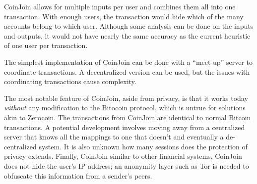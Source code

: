 CoinJoin allows for multiple inputs per user and combines them all into one transaction. With enough users, the transaction would hide which of the many accounts belong to which user. Although some analysis can be done on the inputs and outputs, it would not have nearly the same accuracy as the current heuristic of one user per transaction.

The simplest implementation of CoinJoin can be done with a ``meet-up'' server to coordinate transactions. A decentralized version can be used, but the issues with coordinating transactions cause complexity.

The most notable feature of CoinJoin, aside from privacy, is that it works today \emph{without} any modification to the Bitocoin protocol, which is untrue for solutions akin to Zerocoin. The transactions from CoinJoin are identical to normal Bitcoin transactions. A potential development involves moving away from a centralized server that knows all the mappings to one that doesn't and eventually a de-centralized system. It is also unknown how many sessions does the protection of privacy extends. Finally, CoinJoin similar to other financial systems, CoinJoin does not hide the user's IP address; an anonymity layer such as Tor is needed to obfuscate this information from a sender's peers.






